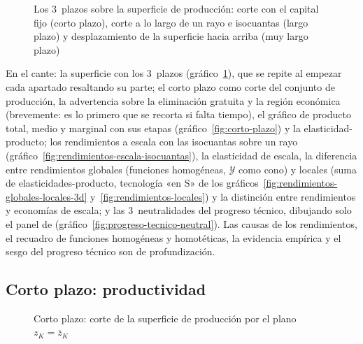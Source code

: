 \documentclass[11pt]{article}
\begin{document}
\begin{figure}[H]
\centering
\caption{Los 3~plazos sobre la superficie de producción: corte con el capital fijo (corto plazo), corte a lo largo de un rayo e isocuantas (largo plazo) y desplazamiento de la superficie hacia arriba (muy largo plazo)}\label{fig:plazos-3d}
\end{figure}

\begin{notaopositor}
En el cante: la superficie con los 3~plazos (gráfico~\ref{fig:plazos-3d}), que se repite al empezar cada apartado resaltando su parte; el corto plazo como corte del conjunto de producción, la advertencia sobre la eliminación gratuita y la región económica (brevemente: es lo primero que se recorta si falta tiempo), el gráfico de producto total, medio y marginal con sus etapas (gráfico~\ref{fig:corto-plazo}) y la elasticidad-producto; los rendimientos a escala con las isocuantas sobre un rayo (gráfico~\ref{fig:rendimientos-escala-isocuantas}), la elasticidad de escala, la diferencia entre rendimientos globales (funciones homogéneas, $\mathcal{Y}$ como cono) y locales (suma de elasticidades-producto, tecnología «en S» de los gráficos~\ref{fig:rendimientos-globales-locales-3d} y~\ref{fig:rendimientos-locales}) y la distinción entre rendimientos y economías de escala; y las 3~neutralidades del progreso técnico, dibujando solo el panel de  (gráfico~\ref{fig:progreso-tecnico-neutral}). Las causas de los rendimientos, el recuadro de funciones homogéneas y homotéticas, la evidencia empírica y el sesgo del progreso técnico son de profundización.
\end{notaopositor}

\Needspace{0.55\textheight}
\subsection{Corto plazo: productividad}\label{sec:corto-plazo-productividad}

\begin{figure}[H]
\centering
\caption{Corto plazo: corte de la superficie de producción por el plano $z_K=\overline{z}_K$}\label{fig:plazos-3d-corto}
\end{figure}
\end{document}
